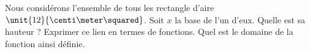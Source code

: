 
\begin{exercice}\label{exoSeconde-0057}

    Nous considérons l'ensemble de tous les rectangle d'aire \( \unit{12}{\centi\meter\squared}\). Soit \( x\) la base de l'un d'eux. Quelle est sa hauteur ? Exprimer ce lien en termes de fonctions. Quel est le domaine de la fonction ainsi définie.

\end{exercice}
